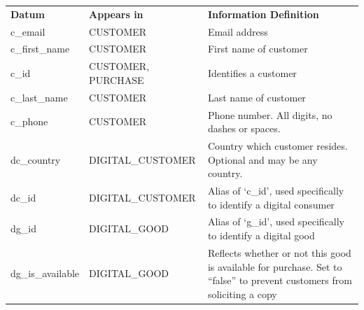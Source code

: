 \documentclass[11pt, a4paper]{report}
\begin{document}
\begin{longtable}{|l|p{4.4cm}|p{7cm}|}

\hline
\textbf{Datum}          & \textbf{Appears in}    & \textbf{Information Definition} \\
c\_email                & CUSTOMER               & Email address                                                                                                                                                         \\ \hline
c\_first\_name          & CUSTOMER               & First name of customer                                                                                                                                                \\ \hline
c\_id                   & CUSTOMER, PURCHASE     & Identifies a customer                                                                                                                                                 \\ \hline
c\_last\_name           & CUSTOMER               & Last name of customer                                                                                                                                                 \\ \hline
c\_phone                & CUSTOMER               & Phone number. All digits, no dashes or spaces.                                                                                                                        \\ \hline
dc\_country             & DIGITAL\_CUSTOMER       & Country which customer resides. Optional and may be any country.                                                                                                      \\ \hline
dc\_id                  & DIGITAL\_CUSTOMER       & Alias of `c\_id', used specifically to identify a digital consumer                                                                                                    \\ \hline
dg\_id                  & DIGITAL\_GOOD           & Alias of `g\_id', used specifically to identify a digital good                                                                                                        \\ \hline
dg\_is\_available       & DIGITAL\_GOOD           & Reflects whether or not this good is available for purchase. Set to ``false'' to prevent customers from soliciting a copy                                             \\ \hline

\end{longtable}
\end{document}

